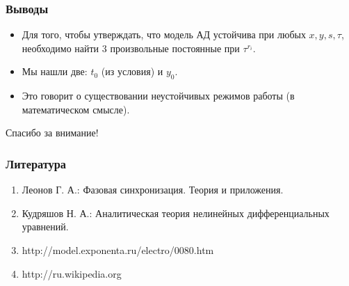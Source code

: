 \documentclass[hyperref={pdftex,unicode}]{beamer}
\begin{document}
\begin{frame}

\frametitle{Выводы}

\begin{itemize}

\item
Для того, чтобы утверждать, что модель АД устойчива при любых $x, y, s, \tau $, необходимо найти 3 произвольные постоянные при $ \tau^{r_i} $.

\item
Мы нашли две: $ t_0 $ (из условия) и $ y_0 $.

\item
Это говорит о существовании неустойчивых режимов работы (в математическом смысле).

\end{itemize}


\end{frame}


\begin{frame}
\begin{center}

Спасибо за внимание!

\end{center}
\end{frame}


\begin{frame}
\frametitle{Литература}

\begin{enumerate}
\item{Леонов Г. А.: Фазовая синхронизация. Теория и приложения.}
\item{Кудряшов Н. А.: Аналитическая теория нелинейных дифференциальных уравнений.}

\item{http://model.exponenta.ru/electro/0080.htm}
\item{http://ru.wikipedia.org}

\end{enumerate}

\end{frame}
\end{document}
